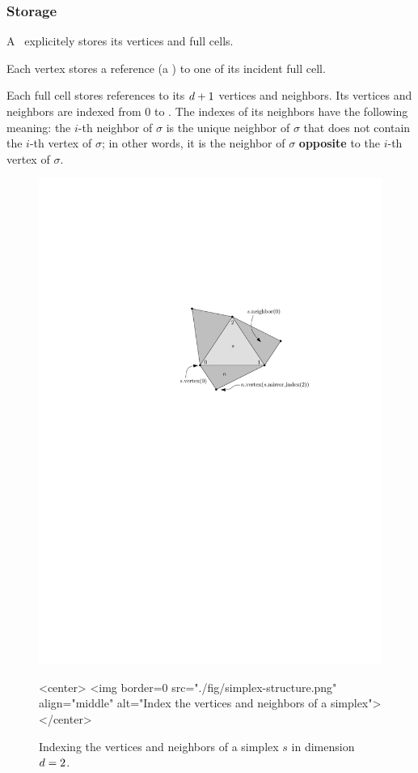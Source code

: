 \subsubsection{Storage}

A \tds\ explicitely stores its vertices and full cells.

Each vertex stores a reference (a ) to one of its incident
full cell.


Each full cell stores references to its $d+1$ vertices and
neighbors. Its vertices and neighbors are indexed from $0$ to \cd. The indexes
of its neighbors have the following meaning: the $i$-th neighbor of $\sigma$
is the unique neighbor of $\sigma$ that does not contain the $i$-th vertex of
$\sigma$; in other words, it is the neighbor of $\sigma$ \textbf{opposite} to
the $i$-th vertex of $\sigma$.

\begin{figure}[htbp]
\begin{ccTexOnly}
\begin{center}
\includegraphics{Triangulation/fig/simplex-structure.pdf}
\end{center}
\end{ccTexOnly}
\begin{ccHtmlOnly}
<center>
<img border=0 src="./fig/simplex-structure.png" align="middle" alt="Index the vertices and neighbors of a simplex">
</center>
\end{ccHtmlOnly}
\caption{Indexing the vertices and neighbors of a simplex $s$ in
  dimension $d=2$.}
\label{triangulation:fig:simplex}
\end{figure} 

